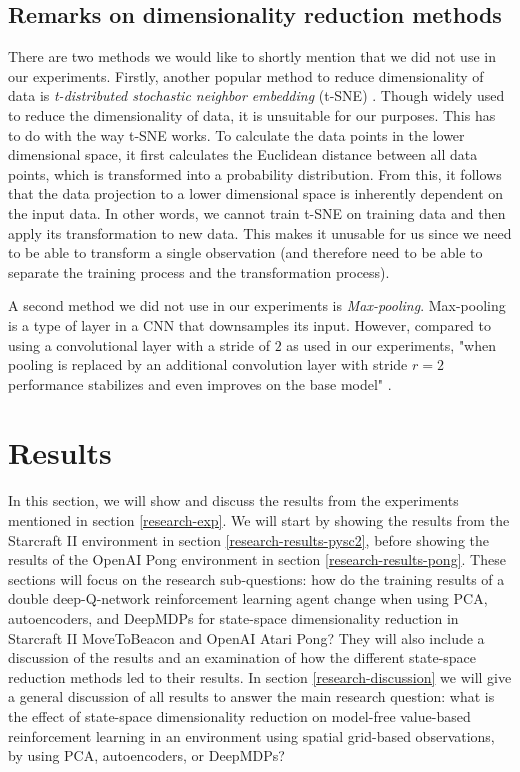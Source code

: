 \subsection{Remarks on dimensionality reduction methods}
There are two methods we would like to shortly mention that we did not use in our experiments. Firstly, another popular method to reduce dimensionality of data is \emph{t-distributed stochastic neighbor embedding} (t-SNE) \cite{tsne}. Though widely used to reduce the dimensionality of data, it is unsuitable for our purposes. This has to do with the way t-SNE works. To calculate the data points in the lower dimensional space, it first calculates the Euclidean distance between all data points, which is transformed into a probability distribution. From this, it follows that the data projection to a lower dimensional space is inherently dependent on the input data. In other words, we cannot train t-SNE on training data and then apply its transformation to new data. This makes it unusable for us since we need to be able to transform a single observation (and therefore need to be able to separate the training process and the transformation process). 

A second method we did not use in our experiments is \emph{Max-pooling}. Max-pooling is a type of layer in a CNN that downsamples its input. However, compared to using a convolutional layer with a stride of $2$ as used in our experiments, "when pooling is replaced by an additional convolution layer with stride $r = 2$ performance stabilizes and even improves on the base model" \cite{maxvsconv}.
 

\section{Results}\label{research-results}
In this section, we will show and discuss the results from the experiments mentioned in section \ref{research-exp}. We will start by showing the results from the Starcraft II environment in section \ref{research-results-pysc2}, before showing the results of the OpenAI Pong environment in section \ref{research-results-pong}. These sections will focus on the research sub-questions: how do the training results of a double deep-Q-network reinforcement learning agent change when using PCA, autoencoders, and DeepMDPs for state-space dimensionality reduction in Starcraft II MoveToBeacon and OpenAI Atari Pong? They will also include a discussion of the results and an examination of how the different state-space reduction methods led to their results. In section \ref{research-discussion} we will give a general discussion of all results to answer the main research question: what is the effect of state-space dimensionality reduction on model-free value-based reinforcement learning in an environment using spatial grid-based observations, by using PCA, autoencoders, or DeepMDPs?

